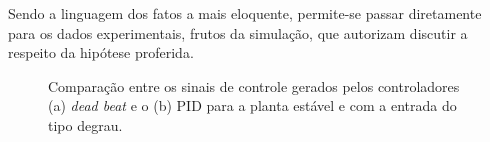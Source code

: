 Sendo a linguagem dos fatos a mais eloquente, permite-se passar diretamente para os dados experimentais, frutos da simulação, que autorizam discutir a respeito da hipótese proferida.


\begin{figure}[H]
\begin{center}
\end{center}
\caption{Comparação entre os sinais de controle gerados pelos controladores (a) \textit{dead beat} e o (b) PID para a planta estável e com a entrada do tipo degrau.}
\label{deadbeat:est} 
\end{figure}

